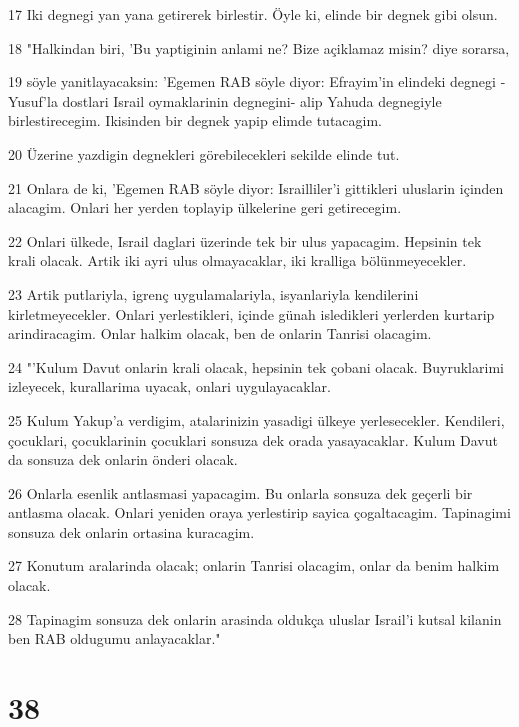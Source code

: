 \par 17 Iki degnegi yan yana getirerek birlestir. Öyle ki, elinde bir degnek gibi olsun.
\par 18 "Halkindan biri, 'Bu yaptiginin anlami ne? Bize açiklamaz misin? diye sorarsa,
\par 19 söyle yanitlayacaksin: 'Egemen RAB söyle diyor: Efrayim'in elindeki degnegi -Yusuf'la dostlari Israil oymaklarinin degnegini- alip Yahuda degnegiyle birlestirecegim. Ikisinden bir degnek yapip elimde tutacagim.
\par 20 Üzerine yazdigin degnekleri görebilecekleri sekilde elinde tut.
\par 21 Onlara de ki, 'Egemen RAB söyle diyor: Israilliler'i gittikleri uluslarin içinden alacagim. Onlari her yerden toplayip ülkelerine geri getirecegim.
\par 22 Onlari ülkede, Israil daglari üzerinde tek bir ulus yapacagim. Hepsinin tek krali olacak. Artik iki ayri ulus olmayacaklar, iki kralliga bölünmeyecekler.
\par 23 Artik putlariyla, igrenç uygulamalariyla, isyanlariyla kendilerini kirletmeyecekler. Onlari yerlestikleri, içinde günah isledikleri yerlerden kurtarip arindiracagim. Onlar halkim olacak, ben de onlarin Tanrisi olacagim.
\par 24 "'Kulum Davut onlarin krali olacak, hepsinin tek çobani olacak. Buyruklarimi izleyecek, kurallarima uyacak, onlari uygulayacaklar.
\par 25 Kulum Yakup'a verdigim, atalarinizin yasadigi ülkeye yerlesecekler. Kendileri, çocuklari, çocuklarinin çocuklari sonsuza dek orada yasayacaklar. Kulum Davut da sonsuza dek onlarin önderi olacak.
\par 26 Onlarla esenlik antlasmasi yapacagim. Bu onlarla sonsuza dek geçerli bir antlasma olacak. Onlari yeniden oraya yerlestirip sayica çogaltacagim. Tapinagimi sonsuza dek onlarin ortasina kuracagim.
\par 27 Konutum aralarinda olacak; onlarin Tanrisi olacagim, onlar da benim halkim olacak.
\par 28 Tapinagim sonsuza dek onlarin arasinda oldukça uluslar Israil'i kutsal kilanin ben RAB oldugumu anlayacaklar."

\chapter{38}

